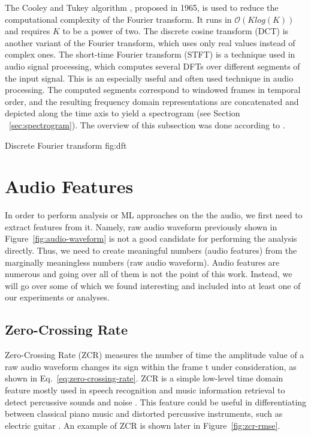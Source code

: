 The Cooley and Tukey algorithm \cite{cooley1965algorithm}, proposed in 1965, is used to reduce the computational complexity of the Fourier transform. It runs in $\mathcal{O}(K log(K))$ and requires $K$ to be a power of two. The discrete cosine transform (DCT) is another variant of the Fourier transform, which uses only real values instead of complex ones. The short-time Fourier transform (STFT) is a technique used in audio signal processing, which computes several DFTs over different segments of the input signal. This is an especially useful and often used technique in audio processing. The computed segments correspond to windowed frames in temporal order, and the resulting frequency domain representations are concatenated and depicted along the time axis to yield a spectrogram (see Section ~\ref{sec:spectrogram}). The overview of this subsection was done according to \cite{knees2016music}.

			{Discrete Fourier transform \cite{kong2020python}}
			{fig:dft}


\section{Audio Features}
\label{sec:audio-features}
In order to perform analysis or ML approaches on the the audio, we first need to extract features from it. Namely, raw audio waveform previously shown in Figure~\ref{fig:audio-waveform} is not a good candidate for performing the analysis directly. Thus, we need to create meaningful numbers (audio features) from the marginally meaningless numbers (raw audio waveform). Audio features are numerous and going over all of them is not the point of this work. Instead, we will go over some of which we found interesting and included into at least one of our experiments or analyses. 

\subsection{Zero-Crossing Rate}
\label{sec:zero-crossing-rate}
Zero-Crossing Rate (ZCR) measures the number of time the amplitude value of a raw audio waveform changes its sign within the frame t under consideration, as shown in Eq.~\ref{eq:zero-crossing-rate}.
\ZCRequation
ZCR is a simple low-level time domain feature mostly used in speech recognition and music information retrieval to detect percussive sounds and noise \cite{gouyon2000use}. This feature could be useful in differentiating between classical piano music and distorted percussive instruments, such as electric guitar \cite{knees2016music}. An example of ZCR is shown later in Figure~\ref{fig:zcr-rmse}.

